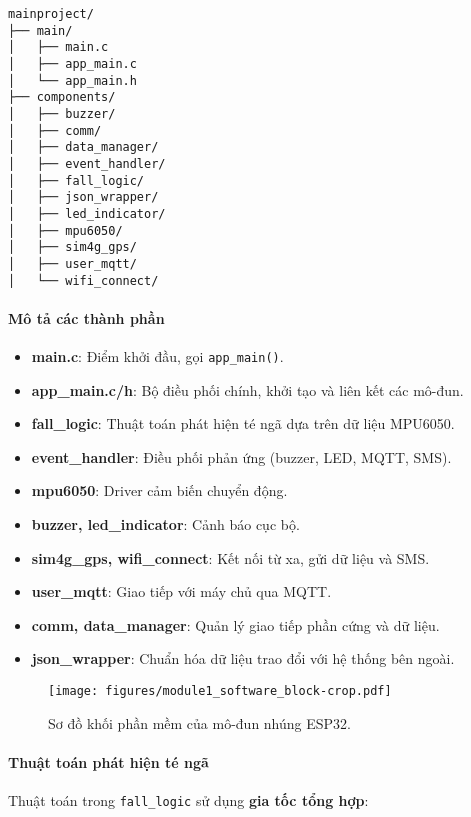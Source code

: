 \begin{verbatim}
mainproject/
├── main/
│   ├── main.c
│   ├── app_main.c
│   └── app_main.h
├── components/
│   ├── buzzer/
│   ├── comm/
│   ├── data_manager/
│   ├── event_handler/
│   ├── fall_logic/
│   ├── json_wrapper/
│   ├── led_indicator/
│   ├── mpu6050/
│   ├── sim4g_gps/
│   ├── user_mqtt/
│   └── wifi_connect/
\end{verbatim}

\paragraph{Mô tả các thành phần}
\begin{itemize}
    \item \textbf{main.c}: Điểm khởi đầu, gọi \texttt{app\_main()}.  
    \item \textbf{app\_main.c/h}: Bộ điều phối chính, khởi tạo và liên kết các mô-đun.  
    \item \textbf{fall\_logic}: Thuật toán phát hiện té ngã dựa trên dữ liệu MPU6050.  
    \item \textbf{event\_handler}: Điều phối phản ứng (buzzer, LED, MQTT, SMS).  
    \item \textbf{mpu6050}: Driver cảm biến chuyển động.  
    \item \textbf{buzzer, led\_indicator}: Cảnh báo cục bộ.  
    \item \textbf{sim4g\_gps, wifi\_connect}: Kết nối từ xa, gửi dữ liệu và SMS.  
    \item \textbf{user\_mqtt}: Giao tiếp với máy chủ qua MQTT.  
    \item \textbf{comm, data\_manager}: Quản lý giao tiếp phần cứng và dữ liệu.  
    \item \textbf{json\_wrapper}: Chuẩn hóa dữ liệu trao đổi với hệ thống bên ngoài.
\end{itemize}

\begin{figure}[H]
    \centering
    \texttt{[image: figures/module1\_software\_block-crop.pdf]}
    \caption{Sơ đồ khối phần mềm của mô-đun nhúng ESP32.}
    \label{fig:module1_software_block}
\end{figure}

\paragraph{Thuật toán phát hiện té ngã}  
Thuật toán trong \texttt{fall\_logic} sử dụng \textbf{gia tốc tổng hợp}:


